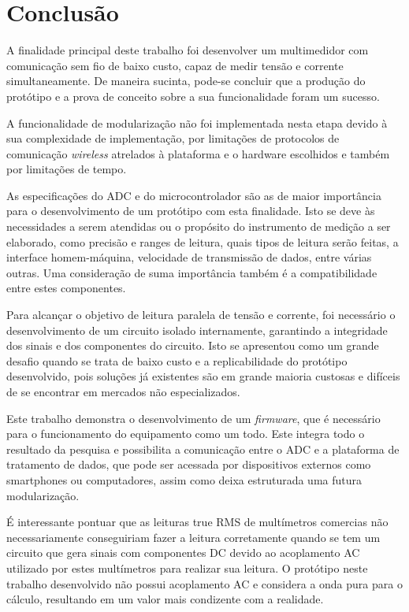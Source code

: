 \chapter{Conclusão}\label{cap:conclusoeseperspectivas}

A finalidade principal deste trabalho foi desenvolver um multimedidor com comunicação sem fio de baixo custo, capaz de medir tensão e corrente simultaneamente. De maneira sucinta, pode-se concluir que a produção do protótipo e a prova de conceito sobre a sua funcionalidade foram um sucesso.

A funcionalidade de modularização não foi implementada nesta etapa devido à sua complexidade de implementação, por limitações de protocolos de comunicação \textit{wireless} atrelados à plataforma e o hardware escolhidos e também por limitações de tempo. 

As especificações do \gls{ADC} e do microcontrolador são as de maior importância para o desenvolvimento de um protótipo com esta finalidade. Isto se deve às necessidades a serem atendidas ou o propósito do instrumento de medição a ser elaborado, como precisão e ranges de leitura, quais tipos de leitura serão feitas, a interface homem-máquina, velocidade de transmissão de dados, entre várias outras. Uma consideração de suma importância também é a compatibilidade entre estes componentes.

Para alcançar o objetivo de leitura paralela de tensão e corrente, foi necessário o desenvolvimento de um circuito isolado internamente, garantindo a integridade dos sinais e dos componentes do circuito. Isto se apresentou como um grande desafio quando se trata de baixo custo e a replicabilidade do protótipo desenvolvido, pois soluções já existentes são em grande maioria custosas e difíceis de se encontrar em mercados não especializados.

Este trabalho demonstra o desenvolvimento de um \textit{firmware}, que é necessário para o funcionamento do equipamento como um todo. Este integra todo o resultado da pesquisa e possibilita a comunicação entre o ADC e a plataforma de tratamento de dados, que pode ser acessada por dispositivos externos como smartphones ou computadores, assim como deixa estruturada uma futura modularização.

É interessante pontuar que as leituras true RMS de multímetros comercias não necessariamente conseguiriam fazer a leitura corretamente quando se tem um circuito que gera sinais com componentes DC devido ao acoplamento AC utilizado por estes multímetros para realizar sua leitura. O protótipo neste trabalho desenvolvido não possui acoplamento AC e considera a onda pura para o cálculo, resultando em um valor mais condizente com a realidade.

